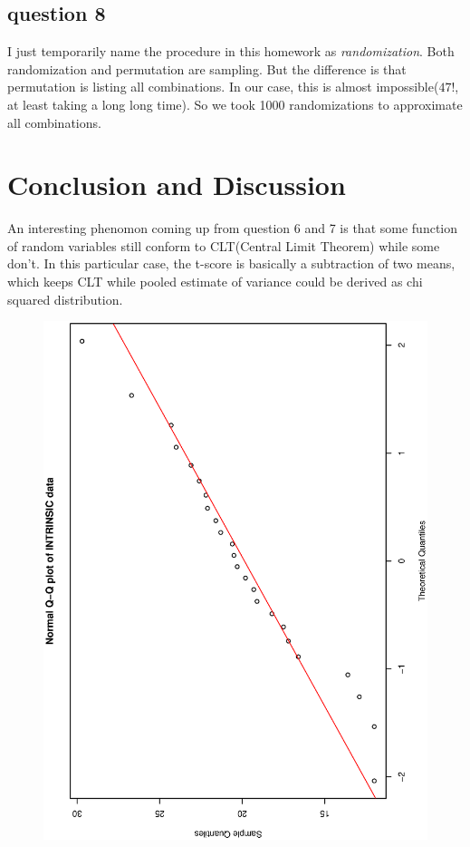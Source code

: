 \documentclass[a4paper,10pt]{article}
\begin{document}
\subsection{question 8}
I just temporarily name the procedure in this homework as \emph{randomization}. Both randomization and permutation are sampling. But the difference is that permutation is listing all combinations. In our case, this is almost impossible($47!$, at least taking a long long time). So we took 1000 randomizations to approximate all combinations.

\section{Conclusion and Discussion}
An interesting phenomon coming up from question 6 and 7 is that some function of random variables still conform to CLT(Central Limit Theorem) while some don't. In this particular case, the t-score is basically a subtraction of two means, which keeps CLT while pooled estimate of variance could be derived as chi squared distribution.


\begin{figure}
\includegraphics[angle=-90, width=1\textwidth]{figures/math650_hw4_intrinsic_qqnorm.eps}
\caption{}\label{f1}
\end{figure}
\end{document}
